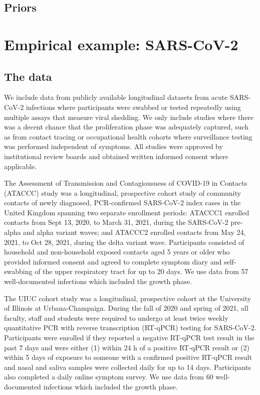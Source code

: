 \documentclass[12pt]{article}
\begin{document}
\subsection{Priors}

\section{Empirical example: SARS-CoV-2}
\subsection{The data} \label{sec:data}
We include data from publicly available longitudinal datasets from acute SARS-CoV-2 infections where participants were swabbed or tested repeatedly using multiple assays that measure viral shedding. We only include studies where there was a decent chance that the proliferation phase was adequately captured, such as from contact tracing or occupational health cohorts where surveillance testing was performed independent of symptoms. All studies were approved by institutional review boards and obtained written informed consent where applicable.

The Assessment of Transmission and Contagiousness of COVID-19 in Contacts (ATACCC) study was a longitudinal, prospective cohort study of community contacts of newly diagnosed, PCR-confirmed SARS-CoV-2 index cases in the United Kingdom spanning two separate enrollment periods: ATACCC1 enrolled contacts from Sept 13, 2020, to March 31, 2021, during the SARS-CoV-2 pre-alpha and alpha variant waves; and ATACCC2 enrolled contacts from May 24, 2021, to Oct 28, 2021, during the delta variant wave. Participants consisted of household and non-household exposed contacts aged 5 years or older who provided informed consent and agreed to complete symptom diary and self-swabbing of the upper respiratory tract for up to 20 days. We use data from 57 well-documented infections which included the growth phase. 

The UIUC cohort study was a longitudinal, prospective cohort at the University of Illinois at Urbana-Champaign. During the fall of 2020 and spring of 2021, all faculty, staff and students were required to undergo at least twice weekly quantitative PCR with reverse transcription (RT-qPCR) testing for SARS-CoV-2. Participants were enrolled if they reported a negative RT-qPCR test result in the past 7 days and were either (1) within 24 h of a positive RT-qPCR result or (2) within 5 days of exposure to someone with a confirmed positive RT-qPCR result and nasal and saliva samples were collected daily for up to 14 days. Participants also completed a daily online symptom survey. We use data from 60 well-documented infections which included the growth phase.
\end{document}
